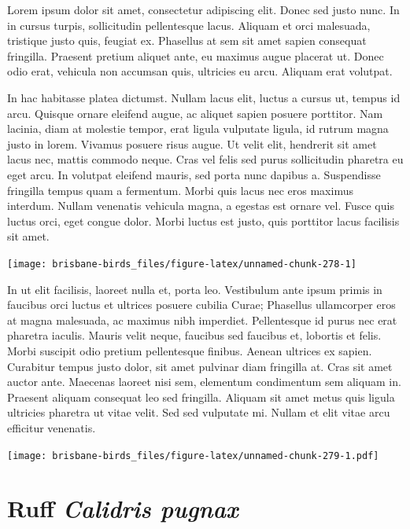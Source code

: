 \documentclass[]{book}
\let\origfigure\figure
\let\endorigfigure\endfigure
\renewenvironment{figure}[1][2] {
  \expandafter\origfigure\expandafter[H]
} {
  \endorigfigure
}
\begin{document}
Lorem ipsum dolor sit amet, consectetur adipiscing elit. Donec sed justo
nunc. In in cursus turpis, sollicitudin pellentesque lacus. Aliquam et
orci malesuada, tristique justo quis, feugiat ex. Phasellus at sem sit
amet sapien consequat fringilla. Praesent pretium aliquet ante, eu
maximus augue placerat ut. Donec odio erat, vehicula non accumsan quis,
ultricies eu arcu. Aliquam erat volutpat.

In hac habitasse platea dictumst. Nullam lacus elit, luctus a cursus ut,
tempus id arcu. Quisque ornare eleifend augue, ac aliquet sapien posuere
porttitor. Nam lacinia, diam at molestie tempor, erat ligula vulputate
ligula, id rutrum magna justo in lorem. Vivamus posuere risus augue. Ut
velit elit, hendrerit sit amet lacus nec, mattis commodo neque. Cras vel
felis sed purus sollicitudin pharetra eu eget arcu. In volutpat eleifend
mauris, sed porta nunc dapibus a. Suspendisse fringilla tempus quam a
fermentum. Morbi quis lacus nec eros maximus interdum. Nullam venenatis
vehicula magna, a egestas est ornare vel. Fusce quis luctus orci, eget
congue dolor. Morbi luctus est justo, quis porttitor lacus facilisis sit
amet.

\begin{figure}
\texttt{[image: brisbane-birds\_files/figure-latex/unnamed-chunk-278-1]} \caption{insert figure caption}\label{fig:unnamed-chunk-278}
\end{figure}

In ut elit facilisis, laoreet nulla et, porta leo. Vestibulum ante ipsum
primis in faucibus orci luctus et ultrices posuere cubilia Curae;
Phasellus ullamcorper eros at magna malesuada, ac maximus nibh
imperdiet. Pellentesque id purus nec erat pharetra iaculis. Mauris velit
neque, faucibus sed faucibus et, lobortis et felis. Morbi suscipit odio
pretium pellentesque finibus. Aenean ultrices ex sapien. Curabitur
tempus justo dolor, sit amet pulvinar diam fringilla at. Cras sit amet
auctor ante. Maecenas laoreet nisi sem, elementum condimentum sem
aliquam in. Praesent aliquam consequat leo sed fringilla. Aliquam sit
amet metus quis ligula ultricies pharetra ut vitae velit. Sed sed
vulputate mi. Nullam et elit vitae arcu efficitur venenatis.

\begin{figure}
\centering
\texttt{[image: brisbane-birds\_files/figure-latex/unnamed-chunk-279-1.pdf]}
\caption{\label{fig:unnamed-chunk-279}insert figure caption}
\end{figure}

\section{\texorpdfstring{Ruff \emph{Calidris
pugnax}}{Ruff Calidris pugnax}}\label{ruff-calidris-pugnax}
\end{document}
